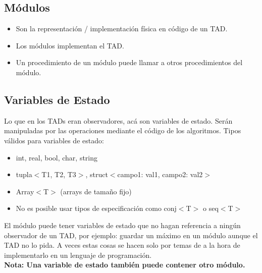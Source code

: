 \documentclass[10pt,a4paper]{article}
\begin{document}
\subsection*{Módulos}
\begin{itemize}
    \item Son la representación / implementación física en código de un TAD.
    \item Los módulos implementan el TAD.
    \item Un procedimiento de un módulo puede llamar a otros procedimientos del módulo.
\end{itemize}
\subsection*{Variables de Estado}
Lo que en los TADs eran observadores, acá son variables de estado. Serán manipuladas por las operaciones mediante el código de los algoritmos. 
Tipos válidos para variables de estado: 
\begin{itemize}
    \item int, real, bool, char, string
    \item tupla\(<\)T1, T2, T3\(>\), struct\(<\)campo1: val1, campo2: val2\(>\)
    \item Array\(<\)T\(>\) (arrays de tamaño fijo)
    \item No es posible usar tipos de especificación como conj\(<\)T\(>\) o seq\(<\)T\(>\)
\end{itemize}
El módulo puede tener variables de estado que no hagan referencia a ningún observador de un TAD, por ejemplo: guardar un máximo en un módulo aunque el TAD no lo pida. A veces estas cosas se hacen solo por temas de a la hora de implementarlo en un lenguaje de programación. \\ 
\textbf{Nota: Una variable de estado también puede contener otro módulo.}
\end{document}
